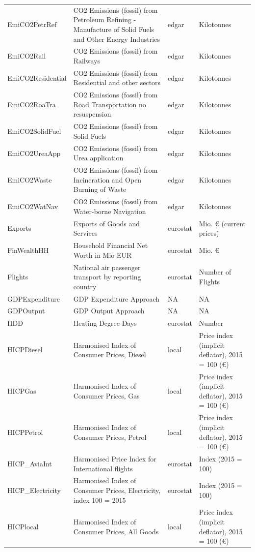 \begin{longtable}[t]{>{\raggedright\arraybackslash}p{3.5cm}>{\raggedright\arraybackslash}p{5.5cm}>{\raggedright\arraybackslash}p{2cm}>{\raggedright\arraybackslash}p{4cm}}
EmiCO2PetrRef & CO2 Emissions (fossil) from Petroleum Refining - Manufacture of Solid Fuels and Other Energy Industries & edgar & Kilotonnes\\
EmiCO2Rail & CO2 Emissions (fossil) from Railways & edgar & Kilotonnes\\
EmiCO2Residential & CO2 Emissions (fossil) from Residential and other sectors & edgar & Kilotonnes\\
\addlinespace
EmiCO2RoaTra & CO2 Emissions (fossil) from Road Transportation no resuspension & edgar & Kilotonnes\\
EmiCO2SolidFuel & CO2 Emissions (fossil) from Solid Fuels & edgar & Kilotonnes\\
EmiCO2UreaApp & CO2 Emissions (fossil) from Urea application & edgar & Kilotonnes\\
EmiCO2Waste & CO2 Emissions (fossil) from Incineration and Open Burning of Waste & edgar & Kilotonnes\\
EmiCO2WatNav & CO2 Emissions (fossil) from Water-borne Navigation & edgar & Kilotonnes\\
\addlinespace
Exports & Exports of Goods and Services & eurostat & Mio. € (current prices)\\
FinWealthHH & Household Financial Net Worth in Mio EUR & eurostat & Mio. €\\
Flights & National air passenger transport by reporting country & eurostat & Number of Flights\\
GDPExpenditure & GDP Expenditure Approach & NA & NA\\
GDPOutput & GDP Output Approach & NA & NA\\
\addlinespace
HDD & Heating Degree Days & eurostat & Number\\
HICPDiesel & Harmonised Index of Consumer Prices, Diesel & local & Price index (implicit deflator), 2015 = 100 (€)\\
HICPGas & Harmonised Index of Consumer Prices, Gas & local & Price index (implicit deflator), 2015 = 100 (€)\\
HICPPetrol & Harmonised Index of Consumer Prices, Petrol & local & Price index (implicit deflator), 2015 = 100 (€)\\
HICP\_AviaInt & Harmonised Price Index for International flights & eurostat & Index (2015 = 100)\\
\addlinespace
HICP\_Electricity & Harmonised Index of Consumer Prices, Electricity, index 100 = 2015 & eurostat & Index (2015 = 100)\\
HICPlocal & Harmonised Index of Consumer Prices, All Goods & local & Price index (implicit deflator), 2015 = 100 (€)\\

\end{longtable}
